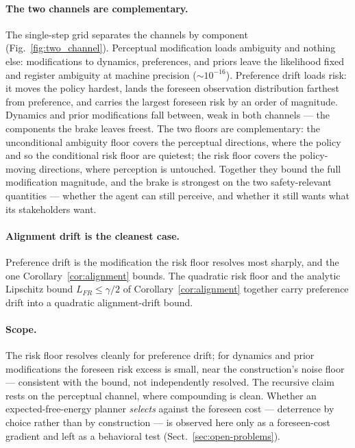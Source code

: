 \documentclass[runningheads]{llncs}
\begin{document}
\paragraph{The two channels are complementary.} The single-step grid separates
the channels by component (Fig.~\ref{fig:two_channel}). Perceptual modification
loads ambiguity and nothing else: modifications to dynamics, preferences, and
priors leave the likelihood fixed and register ambiguity at machine precision
($\sim\!10^{-16}$). Preference drift loads risk: it moves the policy hardest,
lands the foreseen observation distribution farthest from preference, and
carries the largest foreseen risk by an order of magnitude. Dynamics and prior
modifications fall between, weak in both channels --- the components the brake
leaves freest. The two floors are complementary: the unconditional ambiguity
floor covers the perceptual directions, where the policy and so the conditional
risk floor are quietest; the risk floor covers the policy-moving directions,
where perception is untouched. Together they bound the full modification
magnitude, and the brake is strongest on the two safety-relevant quantities ---
whether the agent can still perceive, and whether it still wants what its
stakeholders want.

\paragraph{Alignment drift is the cleanest case.} Preference drift is the modification the risk floor resolves most sharply, and the one Corollary~\ref{cor:alignment} bounds. The quadratic risk floor and the analytic Lipschitz bound $L_{FR} \leq \gamma/2$ of Corollary~\ref{cor:alignment} together carry preference drift into a quadratic alignment-drift bound.

\paragraph{Scope.} The risk floor resolves cleanly for preference drift; for
dynamics and prior modifications the foreseen risk excess is small, near the
construction's noise floor --- consistent with the bound, not independently
resolved. The recursive claim rests on the perceptual channel, where compounding
is clean. Whether an expected-free-energy planner \emph{selects} against the
foreseen cost --- deterrence by choice rather than by construction --- is
observed here only as a foreseen-cost gradient and left as a behavioral test
(Sect.~\ref{sec:open-problems}).
\end{document}
